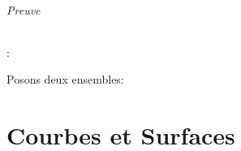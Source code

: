 \documentclass{article}
\begin{document}
\paragraph{Preuve}: \space

Posons deux ensembles:
















\newpage
\part{Courbes et Surfaces}
\end{document}
